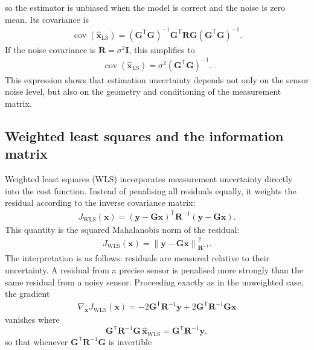 \documentclass[graybox,envcountchap]{style/SNmono}
\begin{document}
so the estimator is unbiased when the model is correct and the noise is zero mean. Its covariance is
\begin{align}
\operatorname{cov} \left( \widehat{\mathbf{x}}_{\mathrm{LS}} \right) =
\left(
\mathbf{G}^{\mathsf T}
\mathbf{G}
\right)^{-1}
\mathbf{G}^{\mathsf T}
\mathbf{R}
\mathbf{G}
\left(
\mathbf{G}^{\mathsf T}
\mathbf{G}
\right)^{-1}.
\end{align}
If the noise covariance is $\mathbf{R}=\sigma^2\mathbf{I}$, this simplifies to
\begin{align}
\operatorname{cov} \left(\widehat{\mathbf{x}}_{\mathrm{LS}} \right) = \sigma^2\left( \mathbf{G}^{\mathsf T} \mathbf{G} \right)^{-1}.
\end{align}
This expression shows that estimation uncertainty depends not only on the sensor noise level, but also on the geometry and conditioning of the measurement matrix.

\subsection{Weighted least squares and the information matrix}

Weighted least squares (WLS) incorporates measurement uncertainty directly into the cost function. Instead of penalising all residuals equally, it weights the residual according to the inverse covariance matrix:
\begin{align}
J_{\mathrm{WLS}}(\mathbf{x}) = \left( \mathbf{y} - \mathbf{G}\mathbf{x} \right)^{\mathsf T} \mathbf{R}^{-1} \left( \mathbf{y} - \mathbf{G}\mathbf{x} \right).
\end{align}
This quantity is the squared Mahalanobis norm of the residual:
\begin{align}
J_{\mathrm{WLS}}(\mathbf{x}) = \left\| \mathbf{y} - \mathbf{G}\mathbf{x} \right\|_{\mathbf{R}^{-1}}^2.
\end{align}
The interpretation is as follows: residuals are measured relative to their uncertainty. A residual from a precise sensor is penalised more strongly than the same residual from a noisy sensor. 
Proceeding exactly as in the unweighted case, the gradient
\begin{align}
\nabla_{\mathbf{x}}
J_{\mathrm{WLS}}(\mathbf{x}) = -2 \mathbf{G}^{\mathsf T} \mathbf{R}^{-1} \mathbf{y} + 2 \mathbf{G}^{\mathsf T} \mathbf{R}^{-1} \mathbf{G} \mathbf{x}
\end{align}
vanishes where $$\mathbf{G}^{\mathsf T}\mathbf{R}^{-1}\mathbf{G}\,\widehat{\mathbf{x}}_{\mathrm{WLS}}=\mathbf{G}^{\mathsf T}\mathbf{R}^{-1}\mathbf{y},$$ so that whenever $\mathbf{G}^{\mathsf T}\mathbf{R}^{-1}\mathbf{G}$ is invertible
\end{document}
